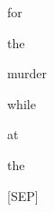 \documentclass[varwidth=150mm]{standalone}
\begin{document}
\begin{CJK*}{UTF8}{gbsn}
{{{\colorbox{red!0.0}{\strut for} \colorbox{red!0.0}{\strut the} \colorbox{red!4.894383907318115}{\strut murder} \colorbox{red!35.898826599121094}{\strut while} \colorbox{red!2.143319845199585}{\strut at} \colorbox{red!93.37517547607422}{\strut the} \colorbox{red!3.5336477756500244}{\strut [SEP]}
}}}
\end{CJK*}
\end{document}
